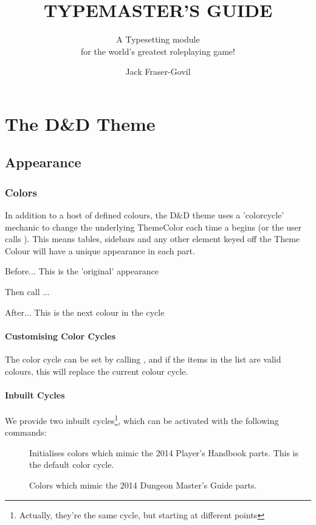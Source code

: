 \documentclass[theme=dnd,size=10pt,columns=2,justified]{rpgbook}
\title{TYPEMASTER'S GUIDE }
\subtitle{A Typesetting module \\ for  the world's greatest roleplaying game!}
\author{Jack Fraser-Govil}
\begin{document}
	


	\chapter{The D\&D Theme}

		\section{Appearance}

			\subsection{Colors}

				In addition to a host of defined colours, the D\&D theme uses a 'colorcycle' mechanic to change the underlying ThemeColor each time a  begins (or the user calls ). This means tables, sidebars and any other element keyed off the Theme Colour will have a unique appearance in each part.

				\begin{RpgTip}{Before...}
					This is the 'original' appearance
				\end{RpgTip}
				Then call ...\RpgAdvanceColors{}
				\begin{RpgTip}{After...}
					This is the next colour in the cycle
				\end{RpgTip}

				\subsubsection{Customising Color Cycles}
					The color cycle can be set by calling , and if the items in the list are valid colours, this will replace the current colour cycle.

				\subsubsection{Inbuilt Cycles}
					We provide two inbuilt cycles\footnote{Actually, they're the same cycle, but starting at different points}, which can be activated with the following commands:
					\begin{description}
						\item[] Initialises colors which mimic the 2014 Player's Handbook parts. This is the default color cycle.
						\item[] Colors which mimic the 2014 Dungeon Master's Guide parts.
					\end{description}
\end{document}
